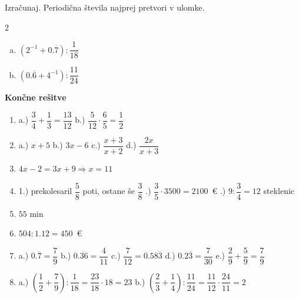 \documentclass[a4paper,12pt]{letter}
\begin{document}
\begin{naloga}
Izra\v{c}unaj. Periodi\v{c}na \v{s}tevila najprej pretvori v ulomke.

\begin{multicols}{2}
\begin{enumerate}[a.)]
\item $\left(2^{-1}+0.\overline{7}\right):\dfrac{1}{18}$
\item $\left(0.\overline{6}+4^{-1}\right):\dfrac{11}{24}$
\end{enumerate}
\end{multicols}
\end{naloga}

\vfill
\begin{center}
\end{center}

\newpage
\begin{center}
{\Large\textbf{Kon\v{c}ne re\v{s}itve}}
\end{center}
\vspace{0.3cm}

\begin{enumerate}

\item a.) $\dfrac{3}{4}+\dfrac{1}{3}=\dfrac{13}{12}$ \quad b.) $\dfrac{5}{12}\cdot\dfrac{6}{5}=\dfrac{1}{2}$

\item a.) $x+5$ \quad b.) $3x-6$ \quad c.) $\dfrac{x+3}{x+2}$ \quad d.) $\dfrac{2x}{x+3}$

\item $4x-2=3x+9 \Rightarrow x=11$

\item 1.) prekolesaril $\dfrac{5}{8}$ poti, ostane \v{s}e $\dfrac{3}{8}$ .) $\dfrac{3}{5}\cdot3500=2100$~\euro{} .) $9:\dfrac{3}{4}=12$ steklenic

\item $55$ min

\item $504:1.12=450$~\euro{}

\item a.) $0.\overline{7}=\dfrac{7}{9}$ \quad b.) $0.\overline{36}=\dfrac{4}{11}$ \quad
c.) $\dfrac{7}{12}=0.58\overline{3}$ \quad d.) $0.2\overline{3}=\dfrac{7}{30}$ \quad
e.) $\dfrac{2}{9}+\dfrac{5}{9}=\dfrac{7}{9}$

\item a.) $\left(\dfrac{1}{2}+\dfrac{7}{9}\right):\dfrac{1}{18}=\dfrac{23}{18}\cdot18=23$ \quad
b.) $\left(\dfrac{2}{3}+\dfrac{1}{4}\right):\dfrac{11}{24}=\dfrac{11}{12}\cdot\dfrac{24}{11}=2$

\end{enumerate}
\end{document}
